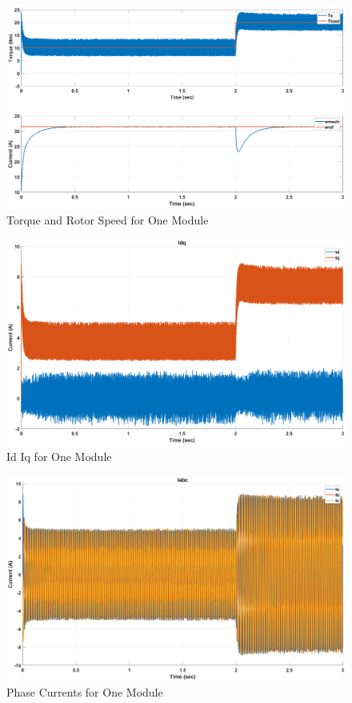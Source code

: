 \documentclass{article}
\begin{document}
\begin{figure}[H]
\centering
\includegraphics[scale=0.3]{Figures/OneModule/Tload_Wshaft.eps}
\caption{Torque and Rotor Speed for One Module}
\label{fig:Tload_Wshaft_OneModule}
\end{figure}
\begin{figure}[H]
\centering
\includegraphics[scale=0.3]{Figures/OneModule/Id_Iq.eps}
\caption{Id Iq for One Module}
\label{fig:Current_dq_OneModule}
\end{figure}
\begin{figure}[H]
\centering
\includegraphics[scale=0.3]{Figures/OneModule/Ia_Ib_Ic.eps}
\caption{Phase Currents for One Module}
\label{fig:Current_abc_OneModule}
\end{figure}
\end{document}

